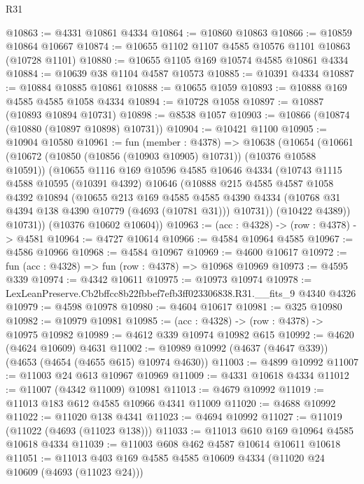 \begin{lexlean}{R31}
\begin{coremodule}
@10863 := @4331 @10861 @4334
@10864 := @10860 @10863
@10866 := @10859 @10864 @10667
@10874 := @10655 @1102 @1107 @4585 @10576 @1101 @10863 (@10728 @1101)
@10880 := @10655 @1105 @169 @10574 @4585 @10861 @4334
@10884 := @10639 @38 @1104 @4587 @10573
@10885 := @10391 @4334
@10887 := @10884 @10885 @10861
@10888 := @10655 @1059
@10893 := @10888 @169 @4585 @4585 @1058 @4334
@10894 := @10728 @1058
@10897 := @10887 (@10893 @10894 @10731)
@10898 := @8538 @1057
@10903 := @10866 (@10874 (@10880 (@10897 @10898) @10731))
@10904 := @10421 @1100
@10905 := @10904 @10580
@10961 := fun (member : @4378) =>
  @10638
    (@10654
      (@10661
        (@10672 (@10850 (@10856 (@10903 @10905) @10731)) (@10376 @10588 @10591))
        (@10655
          @1116
          @169
          @10596
          @4585
          @10646
          @4334
          (@10743
            @1115
            @4588
            @10595
            (@10391 @4392)
            @10646
            (@10888
              @215
              @4585
              @4587
              @1058
              @4392
              @10894
              (@10655
                @213
                @169
                @4585
                @4585
                @4390
                @4334
                (@10768 @31 @4394 @138 @4390 @10779 (@4693 (@10781 @31)))
                @10731))
            (@10422 @4389))
          @10731))
      (@10376 @10602 @10604))
@10963 := (acc : @4328) -> (row : @4378) -> @4581
@10964 := @4727 @10614
@10966 := @4584 @10964 @4585
@10967 := @4586 @10966
@10968 := @4584 @10967
@10969 := @4600 @10617
@10972 := fun (acc : @4328) => fun (row : @4378) => @10968 @10969
@10973 := @4595 @339
@10974 := @4342 @10611
@10975 := @10973 @10974
@10978 := LexLeanPreserve.Cb2bffcc8b22fbbef7efb3ff023306838.R31.__fits_9 @4340 @4326
@10979 := @4598 @10978
@10980 := @4604 @10617
@10981 := @325 @10980
@10982 := @10979 @10981
@10985 := (acc : @4328) -> (row : @4378) -> @10975 @10982
@10989 := @4612 @339 @10974 @10982 @615
@10992 := @4620 (@4624 @10609) @4631
@11002 := @10989 @10992 (@4637 (@4647 @339)) (@4653 (@4654 (@4655 @615) @10974 @4630))
@11003 := @4899 @10992
@11007 := @11003 @24 @613 @10967 @10969
@11009 := @4331 @10618 @4334
@11012 := @11007 (@4342 @11009) @10981
@11013 := @4679 @10992
@11019 := @11013 @183 @612 @4585 @10966 @4341 @11009
@11020 := @4688 @10992
@11022 := @11020 @138 @4341
@11023 := @4694 @10992
@11027 := @11019 (@11022 (@4693 (@11023 @138)))
@11033 := @11013 @610 @169 @10964 @4585 @10618 @4334
@11039 := @11003 @608 @462 @4587 @10614 @10611 @10618
@11051 := @11013 @403 @169 @4585 @4585 @10609 @4334 (@11020 @24 @10609 (@4693 (@11023 @24)))

\end{coremodule}
\end{lexlean}
